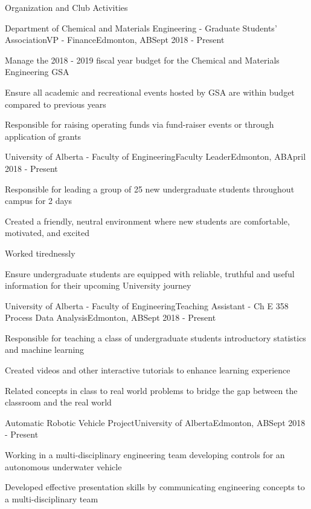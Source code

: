 \documentclass{article}
\newlength{\tabin}
\newlength{\secsep}
\newcommand{\lineunder}{\vspace*{-8pt} \\ \hspace*{-6pt} \hrulefill \\ \vspace*{-15pt}}
\newenvironment{tabbedsection}[1]{
  \begin{list}{}{
      \setlength{\itemsep}{0pt}
      \setlength{\labelsep}{0pt}
      \setlength{\labelwidth}{0pt}
      \setlength{\leftmargin}{\tabin}
      \setlength{\rightmargin}{\tabin}
      \setlength{\listparindent}{0pt}
      \setlength{\parsep}{0pt}
      \setlength{\parskip}{0pt}
      \setlength{\partopsep}{0pt}
      \setlength{\topsep}{#1}
    }
  \item[]
}{\end{list}}
\newenvironment{resume_section}[1]{
  \filbreak
  \vspace{2\secsep}
  \textsc{\large#1}
  \lineunder
  \begin{tabbedsection}{\secsep}
}{\end{tabbedsection}}
\newenvironment{subitems}{
  \renewcommand{\labelitemi}{-}
  \begin{itemize}
      \setlength{\labelsep}{1em}
}{\end{itemize}}
\newenvironment{resume_employer}[4]{
  \vspace{\secsep}
  \textbf{#1} \\ 
  \indent {\small #2} \hfill {\footnotesize#3 (#4)}
  \begin{tabbedsection}{0pt}
  \begin{subitems}
}{\end{subitems}\end{tabbedsection}}
\begin{document}
\begin{resume_section}{Organization and Club Activities}
  \begin{resume_employer}{Department of Chemical and Materials Engineering - Graduate Students' Association}{VP - Finance}{Edmonton, AB}{Sept 2018 - Present}
    \item Manage the 2018 - 2019 fiscal year budget for the Chemical and Materials Engineering GSA
    \item Ensure all academic and recreational events hosted by GSA are within budget compared to previous years
    \item Responsible for raising operating funds via fund-raiser events or through application of grants
  \end{resume_employer}



  \begin{resume_employer}{University of Alberta - Faculty of Engineering}{Faculty Leader}{Edmonton, AB}{April 2018 - Present}
        \item Responsible for leading a group of 25 new undergraduate students throughout campus for 2 days
        \item Created a friendly, neutral environment where new students are comfortable, motivated, and excited
        \item Worked tirednessly 
        \item Ensure undergraduate students are equipped with reliable, truthful and useful information for their upcoming University journey
  \end{resume_employer}
  
  
  
    \begin{resume_employer}{University of Alberta - Faculty of Engineering}{Teaching Assistant - Ch E 358 Process Data Analysis}{Edmonton, AB}{Sept 2018 - Present}
        \item Responsible for teaching a class of undergraduate students introductory statistics and machine learning
        \item Created videos and other interactive tutorials to enhance learning experience
        \item Related concepts in class to real world problems to bridge the gap between the classroom and the real world
  \end{resume_employer}
  
    \begin{resume_employer}{Automatic Robotic Vehicle Project}{University of Alberta}{Edmonton, AB}{Sept 2018 - Present}
        \item Working in a multi-disciplinary engineering team developing controls for an autonomous underwater vehicle 
        \item Developed effective presentation skills by communicating engineering concepts to a multi-disciplinary team 
  \end{resume_employer}
  

\end{resume_section}
\end{document}

